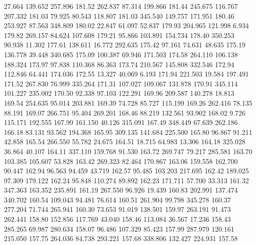   27.664  139.652  257.896       181.52
 262.837   87.314  199.866       181.44
 245.675  116.767  207.332       181.03
  79.925   80.543  118.807       181.03
 345.540  149.757  171.951       180.46
 253.927   87.563  348.809       180.02
  22.847   61.097   52.837       179.93
 204.965  121.998    6.934       179.82
 269.157   84.624  107.608       179.21
  95.866  103.891  154.734       178.40
 350.253   90.938   11.302       177.61
 138.611   16.772  292.635       175.42
  97.161   74.631   48.635       175.19
 136.778   39.448  340.685       175.09
 100.387   69.946  171.503       174.58
 264.110  106.138  188.324       173.97
  97.838  110.368   86.363       173.74
 210.567  145.808  332.546       172.94
 112.846   64.441  174.036       172.55
  13.327   40.069    6.193       171.94
 221.503   19.584  197.491       171.52
 267.830   76.999  335.264       171.31
 107.027  109.067  131.878       170.91
 345.114  101.227  235.002       170.50
  92.338   97.103  122.291       169.96
 209.587  140.278   18.813       169.54
 254.635   95.014  203.881       169.39
  74.728   85.727  115.199       169.26
 262.416   78.135   88.191       169.07
 266.751   95.404  269.201       168.46
  88.219  132.561   93.902       168.02
   9.726  115.171  192.555       167.99
 161.150   40.126  315.091       167.49
 348.449   67.639  262.186       166.18
  83.131   93.562  194.368       165.95
 309.135  141.684  225.500       165.80
  96.867   91.211   42.858       165.54
 266.550   55.782   24.675       164.51
  18.715   64.983   13.306       164.18
 325.028   36.864   40.107       164.11
 337.110  159.768   91.530       163.72
 269.747   79.217  285.581       163.70
 103.385  105.607   53.828       163.42
 269.323   82.464  170.867       163.06
 159.558  162.700   90.447       162.94
  96.563   94.459   43.719       162.57
  95.485  103.203  217.695       162.42
 189.025   97.309  179.122       162.24
  95.848  110.274   89.892       162.23
 171.711   57.700   33.313       161.32
 347.363  163.352  235.891       161.19
 267.550   96.926   19.439       160.83
 202.991  137.474  340.702       160.54
 109.043   94.481   76.614       160.51
 261.904   99.798  345.278       160.37
 277.204   71.744  265.941       160.30
  73.653   91.019  138.501       159.97
 263.191   91.473  262.441       158.80
 152.856  117.769   43.040       158.46
 113.084   36.567   17.236       158.43
 285.265   69.987  280.634       158.07
  96.486  107.329   85.423       157.99
 287.979  120.161  215.050       157.75
 264.036   84.738  293.221       157.68
 338.806  132.427  224.931       157.58
